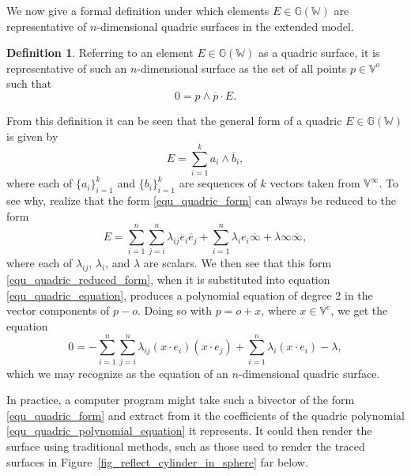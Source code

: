 \documentclass{birkjour}
\theoremstyle{definition}
\newtheorem{defn}[thm]{Definition}
\theoremstyle{remark}
\numberwithin{equation}{section}
\newcommand{\G}{\mathbb{G}}
\newcommand{\V}{\mathbb{V}}
\newcommand{\W}{\mathbb{W}}
\newcommand{\nvao}{o}
\newcommand{\nvai}{\infty}
\newcommand{\nvaib}{\overline{\infty}}
\begin{document}
We now give a formal definition under which elements $E\in\G(\W)$
are representative of $n$-dimensional quadric surfaces in the extended model.
\begin{defn}\label{def_quadric}
Referring to an element $E\in\G(\W)$ as a quadric surface, it is representative of such an $n$-dimensional
surface as the set of all points $p\in\V^o$ such that
\begin{equation}\label{equ_quadric_equation}
0 = p\wedge\overline{p}\cdot E.
\end{equation}
\end{defn}
From this definition it can be seen that the general form of a quadric $E\in\G(\W)$ is given by
\begin{equation}\label{equ_quadric_form}
E = \sum_{i=1}^k a_i\wedge\overline{b}_i,
\end{equation}
where each of $\{a_i\}_{i=1}^k$ and $\{b_i\}_{i=1}^k$ are sequences of $k$ vectors
taken from $\V^\nvai$.  To see why, realize that the form \eqref{equ_quadric_form} can
always be reduced to the form
\begin{equation}\label{equ_quadric_reduced_form}
E = \sum_{i=1}^n\sum_{j=i}^n\lambda_{ij}e_i\overline{e}_j+
\sum_{i=1}^n\lambda_i e_i\nvaib+
\lambda\nvai\nvaib,
\end{equation}
where each of $\lambda_{ij}$, $\lambda_i$, and $\lambda$ are scalars.
We then see that this form \eqref{equ_quadric_reduced_form}, when it is
substituted into equation \eqref{equ_quadric_equation}, produces a polynomial
equation of degree 2 in the vector components of $p-\nvao$.
Doing so with $p=\nvao+x$, where $x\in\V^e$, we get the equation
\begin{equation}\label{equ_quadric_polynomial_equation}
0 = -\sum_{i=1}^n\sum_{j=i}^n\lambda_{ij}(x\cdot e_i)(x\cdot e_j)
+\sum_{i=1}^n\lambda_i(x\cdot e_i) - \lambda,
\end{equation}
which we may recognize as the equation of an $n$-dimensional quadric surface.

In practice, a computer program might take such a bivector of the form \eqref{equ_quadric_form}
and extract from it the coefficients of the quadric polynomial \eqref{equ_quadric_polynomial_equation} it
represents.  It could then render the surface using traditional methods, such as those used
to render the traced surfaces in Figure~\ref{fig_reflect_cylinder_in_sphere} far below.
\end{document}
